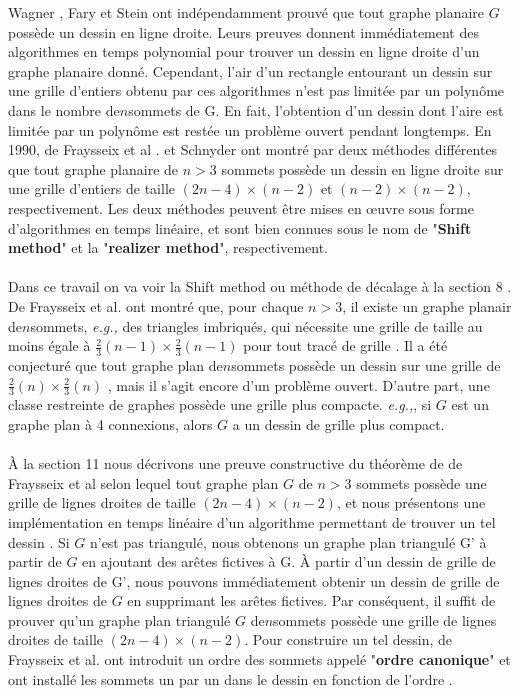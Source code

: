 \documentclass[hidelinks,letterpaper,12pt]{article}
\begin{document}
Wagner \citep{Wagner}, Fary \citep{Fary} et Stein \citep{Stein} ont indépendamment prouvé que tout graphe planaire $G$ possède un dessin en ligne droite. Leurs preuves donnent immédiatement des algorithmes en temps polynomial pour trouver un dessin en ligne droite d'un graphe planaire donné. Cependant, l'air d'un rectangle entourant un dessin sur une grille d'entiers obtenu par ces algorithmes n'est pas limitée par un polynôme dans le nombre de$n$sommets de G. En fait, l'obtention d'un dessin dont l'aire est limitée par un polynôme est restée un problème ouvert pendant longtemps. En 1990, de Fraysseix et al \citep{FraysseixPachPollack}. et Schnyder \citep{Schnyder} ont montré par deux méthodes différentes que tout graphe planaire de $n > 3$ sommets possède un dessin en ligne droite sur une grille d'entiers de taille \( (2n-4) \times (n-2) \) et \( (n-2) \times (n-2) \), respectivement\citep{TakaoSaidur}. Les deux méthodes peuvent être mises en œuvre sous forme d'algorithmes en temps linéaire, et sont bien connues sous le nom de  "\textbf{Shift method}" et la "\textbf{realizer method}", respectivement. 
\\ \\
Dans ce travail on va voir la Shift method ou méthode de décalage à la section 8 \citep{TakaoSaidur}. De Fraysseix et al. ont montré que, pour chaque $n > 3$, il existe un graphe planair de$n$sommets, \textit{e.g.,} des triangles imbriqués, qui nécessite une grille de taille au moins égale à \( \frac{2}{3}(n-1) \times  \frac{2}{3}(n-1) \) pour tout tracé de grille \citep{ChrobakNakano} \citep{FraysseixPachPollack}. Il a été conjecturé que tout graphe plan de$n$sommets possède un dessin sur une grille de \( \frac{2}{3}(n) \times  \frac{2}{3}(n) \)
, mais il s'agit encore d'un problème ouvert. D'autre part, une classe restreinte de graphes possède une grille plus compacte. \textit{e.g.,}, si $G$ est un graphe plan à 4 connexions, alors $G$ a un dessin de grille plus compact\citep{TakaoSaidur}. 
\\ \\	
À la section 11 nous décrivons une preuve constructive du théorème de de Fraysseix et al \citep{FraysseixPachPollack} selon lequel tout graphe plan $G$ de $n > 3$ sommets possède une grille de lignes droites de taille \( (2n-4) \times (n-2) \), et nous présentons une implémentation en temps linéaire d'un algorithme permettant de trouver un tel dessin \citep{ChrobakPayne}. Si $G$ n'est pas triangulé, nous obtenons un graphe plan triangulé G' à partir de $G$ en ajoutant des arêtes fictives à G. À partir d'un dessin de grille de lignes droites de G', nous pouvons immédiatement obtenir un dessin de grille de lignes droites de $G$ en supprimant les arêtes fictives. Par conséquent, il suffit de prouver qu'un graphe plan triangulé $G$ de$n$sommets possède une grille de lignes droites de taille \(  (2n-4) \times (n-2) \). Pour construire un tel dessin, de Fraysseix et al. ont introduit un ordre des sommets appelé "\textbf{ordre canonique}" et ont installé les sommets un par un dans le dessin en fonction de l'ordre \citep{TakaoSaidur}.
\end{document}
